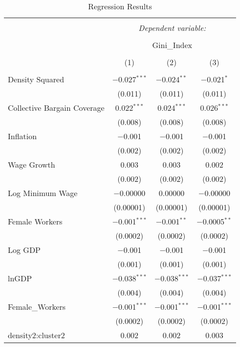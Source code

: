 
\begin{table}[!htbp] \centering 
  \caption{Regression Results} 
  \label{} 
\begin{tabular}{@{\extracolsep{5pt}}lccc} 
\\[-1.8ex]\hline 
\hline \\[-1.8ex] 
 & \multicolumn{3}{c}{\textit{Dependent variable:}} \\ 
\cline{2-4} 
\\[-1.8ex] & \multicolumn{3}{c}{Gini\_Index} \\ 
\\[-1.8ex] & (1) & (2) & (3)\\ 
\hline \\[-1.8ex] 
 Density Squared & $-$0.027$^{***}$ & $-$0.024$^{**}$ & $-$0.021$^{*}$ \\ 
  & (0.011) & (0.011) & (0.011) \\ 
  Collective Bargain Coverage & 0.022$^{***}$ & 0.024$^{***}$ & 0.026$^{***}$ \\ 
  & (0.008) & (0.008) & (0.008) \\ 
  Inflation & $-$0.001 & $-$0.001 & $-$0.001 \\ 
  & (0.002) & (0.002) & (0.002) \\ 
  Wage Growth & 0.003 & 0.003 & 0.002 \\ 
  & (0.002) & (0.002) & (0.002) \\ 
  Log Minimum Wage & $-$0.00000 & 0.00000 & $-$0.00000 \\ 
  & (0.00001) & (0.00001) & (0.00001) \\ 
  Female Workers & $-$0.001$^{***}$ & $-$0.001$^{**}$ & $-$0.0005$^{**}$ \\ 
  & (0.0002) & (0.0002) & (0.0002) \\ 
  Log GDP & $-$0.001 & $-$0.001 & $-$0.001 \\ 
  & (0.001) & (0.001) & (0.001) \\ 
  lnGDP & $-$0.038$^{***}$ & $-$0.038$^{***}$ & $-$0.037$^{***}$ \\ 
  & (0.004) & (0.004) & (0.004) \\ 
  Female\_Workers & $-$0.001$^{***}$ & $-$0.001$^{***}$ & $-$0.001$^{***}$ \\ 
  & (0.0002) & (0.0002) & (0.0002) \\ 
  density2:cluster2 & 0.002 & 0.002 & 0.003 \\ 

\end{tabular}
\end{table}
